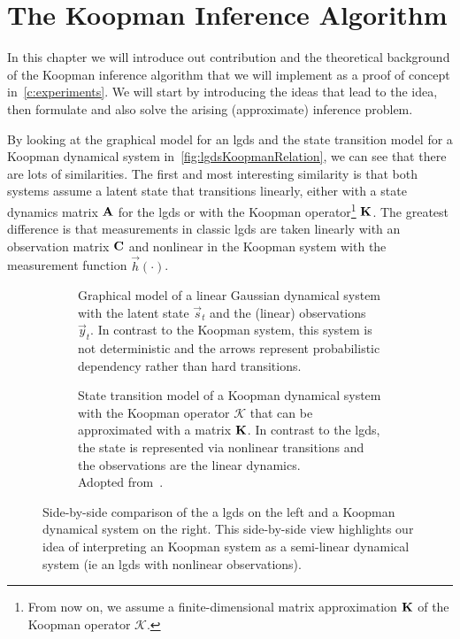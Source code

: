 \chapter{The Koopman Inference Algorithm}
\label{c:nonlinearGaussianKoopman}



In this chapter we will introduce out contribution and the theoretical background of the Koopman inference algorithm that we will implement as a proof of concept in~\autoref{c:experiments}. We will start by introducing the ideas that lead to the idea, then formulate and also solve the arising (approximate) inference problem.

By looking at the graphical model for an \ac{lgds} and the state transition model for a Koopman dynamical system in~\autoref{fig:lgdsKoopmanRelation}, we can see that there are lots of similarities. The first and most interesting similarity is that both systems assume a latent state that transitions linearly, either with a state dynamics matrix \(\boldsymbol{\mathrm{A}}\) for the \ac{lgds} or with the Koopman operator\footnote{From now on, we assume a finite-dimensional matrix approximation \(\boldsymbol{\mathrm{K}}\) of the Koopman operator \(\mathcal{K}\).} \(\boldsymbol{\mathrm{K}}\). The greatest difference is that measurements in classic \ac{lgds} are taken linearly with an observation matrix \( \boldsymbol{\mathrm{C}} \) and nonlinear in the Koopman system with the measurement function \( \vec{h}(\cdot) \).

\begin{figure}
	\centering
	\begin{subfigure}[t]{0.5\linewidth}
		\centering
		\resizebox{\linewidth}{!}{\tikzLinearGaussianDynamicalSystem}
		\caption{Graphical model of a linear Gaussian dynamical system with the latent state \(\vec{s}_t\) and the (linear) observations \(\vec{y}_t\). In contrast to the Koopman system, this system is not deterministic and the arrows represent probabilistic dependency rather than hard transitions.}
	\end{subfigure}%
	\begin{subfigure}[t]{0.5\linewidth}
		\centering
		\resizebox{\linewidth}{!}{\tikzKoopmanOperator}
		\caption{State transition model of a Koopman dynamical system with the Koopman operator \( \mathcal{K} \) that can be approximated with a matrix \(\boldsymbol{\mathrm{K}}\). In contrast to the \ac{lgds}, the state is represented via nonlinear transitions and the observations are the linear dynamics. \\ Adopted from~\cite{bruntonKoopmanInvariantSubspaces2016}.}
	\end{subfigure}
	\caption{Side-by-side comparison of the a \ac{lgds} on the left and a Koopman dynamical system on the right. This side-by-side view highlights our idea of interpreting an Koopman system as a semi-linear dynamical system (\ac{ie} an \ac{lgds} with nonlinear observations).}
	\label{fig:lgdsKoopmanRelation}
\end{figure}

